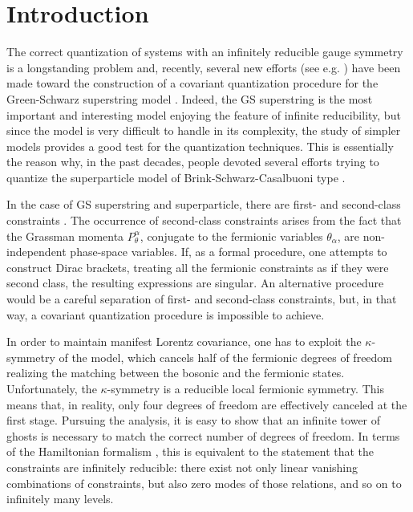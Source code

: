 \documentclass[a4paper,12pt]{article}
\begin{document}
\section{Introduction}
\label{sec:intro}


The correct quantization of systems with an infinitely reducible gauge
symmetry is a longstanding problem and, recently, several new efforts
(see e.g. \cite{berko}) have been made toward the construction of a
covariant quantization procedure for the Green-Schwarz superstring
model \cite{green3}. Indeed, the GS superstring is the most important
and interesting model enjoying the feature of infinite reducibility,
but since the model is very difficult to handle in its complexity, the
study of simpler models provides a good test for the quantization
techniques. This is essentially the reason why, in the past decades,
people devoted several efforts trying to quantize the superparticle
model of Brink-Schwarz-Casalbuoni type \cite{Brink-Schwarz}.

In the case of GS superstring and superparticle, there are first- and
second-class constraints \cite{Dirac,henneaux,gitman,bht}.  The occurrence
of second-class constraints arises from the fact that the Grassman
momenta $P^\alpha_\theta$, conjugate to the fermionic variables
$\theta_\alpha$, are non-independent phase-space variables.  If, as a
formal procedure, one attempts to construct Dirac brackets, treating
all the fermionic constraints as if they were second class, the
resulting expressions are singular. An alternative procedure would be
a careful separation of first- and second-class constraints, but, in
that way, a covariant quantization procedure is impossible to achieve.

In order to maintain manifest Lorentz covariance, one has to exploit
the $\kappa$-symmetry \cite{green3,Siegel:1983hh} of the model, which
cancels half of the fermionic degrees of freedom realizing the
matching between the bosonic and the fermionic states.  Unfortunately,
the $\kappa$-symmetry is a reducible local fermionic symmetry. This
means that, in reality, only four degrees of freedom are effectively
canceled at the first stage. Pursuing the analysis, it is easy to show
that an infinite tower of ghosts is necessary to match the correct
number of degrees of freedom.
%
In terms of the Hamiltonian formalism \cite{gitman}, this is
equivalent to the statement that the constraints are infinitely
reducible: there exist not only linear vanishing combinations of
constraints, but also zero modes of those relations, and so on to
infinitely many levels.
\end{document}
